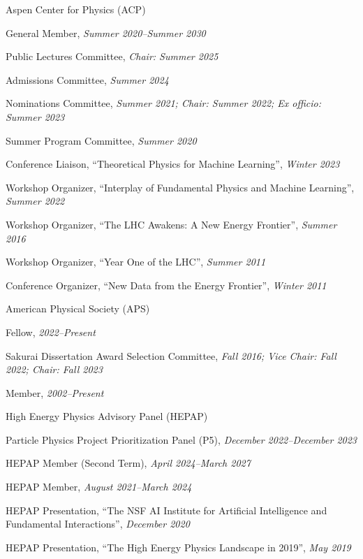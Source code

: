 \item Aspen Center for Physics (ACP)
\bsbl 
\item General Member, \emph{Summer 2020--Summer 2030}
\item Public Lectures Committee, \emph{Chair: Summer 2025}
\item Admissions Committee, \emph{Summer 2024}
\item Nominations Committee, \emph{Summer 2021; Chair: Summer 2022; Ex officio: Summer 2023}
\item Summer Program Committee, \emph{Summer 2020}
\item Conference Liaison, ``Theoretical Physics for Machine Learning'', \emph{Winter 2023}
\item Workshop Organizer, ``Interplay of Fundamental Physics and Machine Learning'', \emph{Summer 2022}
\item Workshop Organizer, ``The LHC Awakens: A New Energy Frontier'', \emph{Summer 2016}
\item Workshop Organizer, ``Year One of the LHC'', \emph{Summer 2011}
\item Conference Organizer, ``New Data from the Energy Frontier'', \emph{Winter 2011}
\el 
\item American Physical Society (APS)
\bsbl 
\item Fellow, \emph{2022--Present}
\item Sakurai Dissertation Award Selection Committee, \emph{Fall 2016; Vice Chair: Fall 2022; Chair: Fall 2023}
\item Member, \emph{2002--Present}
\el 
\item High Energy Physics Advisory Panel (HEPAP)
\bsbl 
\item Particle Physics Project Prioritization Panel (P5), \emph{December 2022--December 2023}
\item HEPAP Member (Second Term), \emph{April 2024--March 2027}
\item HEPAP Member, \emph{August 2021--March 2024}
\item HEPAP Presentation, ``The NSF AI Institute for Artificial Intelligence and Fundamental Interactions'', \emph{December 2020}
\item HEPAP Presentation, ``The High Energy Physics Landscape in 2019'', \emph{May 2019}
\el 
